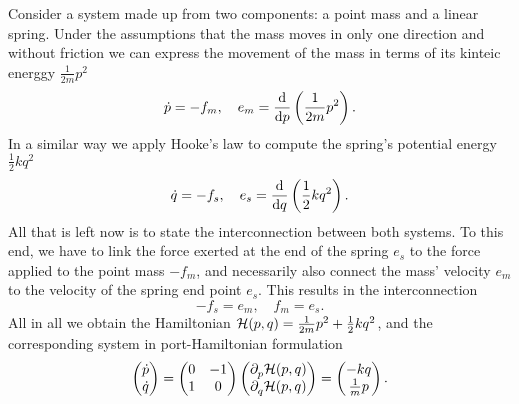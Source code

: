 \begin{example}\label{ex:ms-system}
    Consider a system made up from two components: a point mass and a linear spring.
    Under the assumptions that the mass moves in only one direction and without friction we can express the movement of the mass in terms of its kinteic energgy $\frac{1}{2m} p^2$
    \begin{equation*}
        \dot{p} = -f_m,\quad e_m = \frac{\dif}{\dif p} \left( \frac{1}{2m} p^2 \right).
    \end{equation*}
    In a similar way we apply Hooke's law to compute the spring's potential energy $\frac{1}{2} k q^2$
    \begin{equation*}
        \dot{q} = -f_s,\quad e_s = \frac{\dif}{\dif q} \left( \frac{1}{2} k q^2 \right).
    \end{equation*}
    All that is left now is to state the interconnection between both systems.
    To this end, we have to link the force exerted at the end of the spring $e_s$ to the force applied to the point mass $-f_m$, and necessarily also connect the mass' velocity $e_m$ to the velocity of the spring end point $e_s$.
    This results in the interconnection
    \begin{equation*}
        -f_s = e_m,\quad f_m = e_s.
    \end{equation*}
    All in all we obtain the Hamiltonian $\mcl{H}(p, q) = \frac{1}{2m} p^2 + \frac{1}{2} k q^2$, and the corresponding system in port-Hamiltonian formulation
    \begin{equation*}
        \begin{pmatrix}
            \dot{p} \\
            \dot{q}
        \end{pmatrix} =
        \begin{pmatrix}
            0 & -1 \\
            1 & 0
        \end{pmatrix}
        \begin{pmatrix}
            \pd[p]{} \mcl{H}(p, q) \\
            \pd[q]{} \mcl{H}(p, q)
        \end{pmatrix} =
        \begin{pmatrix}
            -k q \\
            \frac{1}{m} p
        \end{pmatrix}.
    \end{equation*}

\end{example}

